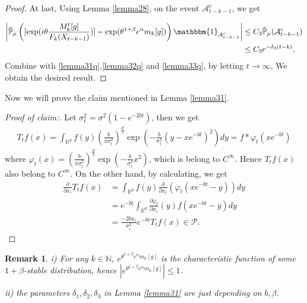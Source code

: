 \documentclass{article}
\newtheorem{remark}{Remark}[section]
\begin{document}
\begin{proof}
At last, Using Lemma \ref{lemma28}, on the event $\mathcal{A}^c_{t-k-1}$, we get

\begin{align}
    \left|\mathbb{\tilde{P}}_{\mu}\left([\exp(i\theta \frac {M_k^t[g]}{F_k(X_{t-k-1})})]-\exp(\theta^{1+\beta}e^{\alpha}m_k[g])\right)\mathbbm{1}_{\mathcal{A}^c_{t-k-1}}\right|&\leq C_3\mathbb{\tilde{P}}_{\mu}(\mathcal{A}^c_{t-k-1})\nonumber\\
    &\leq C_3 e^{-\delta_3(t-k)},\label{lemma33q}
\end{align}
Combine with \eqref{lemma31q},\eqref{lemma32q} and \eqref{lemma33q}, by letting $t \rightarrow \infty$, We obtain the desired result. 
\end{proof}

Now we will prove the claim mentioned in Lemma \ref{lemma31}.


\begin{proof}[Proof of claim:] Let $\sigma_t^2=\sigma^2(1-e^{-2bt})$, then we get
\begin{align*}
    T_t f(x)= \int_{\mathbb{R}^d}f(y)\left(\frac{b}{\pi \sigma_t^2}\right)^{\frac{d}{2}} \exp\left(-\frac{b}{\sigma_t^2}(y-xe^{-bt})^2\right)dy=f\ast\varphi_t(xe^{-bt})
\end{align*}
where $\varphi_t(x)=\left(\frac{b}{\pi \sigma_t^2}\right)^{\frac{d}{2}} \exp\left(-\frac{b}{\sigma_t^2}x^2\right)$, which is belong to $C^{\infty}$. Hence $  T_t f(x)$ also belong to $C^{\infty}$. On the other hand, by calculating, we get
\begin{align*}
    \frac{\partial}{\partial x_i}T_t f(x)&=\int_{\mathbb{R}^d}f(y)\frac{\partial}{\partial x_i}\left(\varphi_t(xe^{-bt}-y)\right)dy\\
    &=e^{-bt}\int_{\mathbb{R}^d}\frac{\partial \varphi_t}{\partial x_i}(y)f(xe^{-bt}-y)dy\\
    &=\frac{-2bx_i}{\sigma_t^2}e^{-bt}T_t f(x)\in \mathcal{P}.
\end{align*}
\end{proof}
\begin{remark}
   i) For any $k\in\mathbb{N}$, $e^{\theta^{1+\beta}e^{\alpha}m_k[g]}$ is the characteristic function of some $1+\beta$-stable distribution, hence $|e^{\theta^{1+\beta}e^{\alpha}m_k[g]}|\leq 1$.
   
   ii) the parameters $\delta_1,\delta_2, \delta_3$ in Lemma \ref{lemma31} are just depending on $b,\beta$.
\end{remark}
\end{document}
